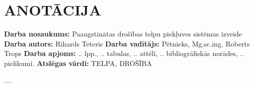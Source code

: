 \chapter*{ANOTĀCIJA}
\noindent \textbf{Darba nosaukums:} Paaugstinātas drošības telpu piekļuves sistēmas izveide\newline
\textbf{Darba autors:} Rihards Teteris\newline
\textbf{Darba vadītājs:} Pētnieks, Mg.sc.ing. Roberts Trops\newline
\textbf{Darba apjoms:} .. lpp., .. tabulas, .. attēli, .. bibliogrāfiskās norādes, .. pielikumi.\newline
\textbf{Atslēgas vārdi:} TELPA, DROŠĪBA\newline

....
